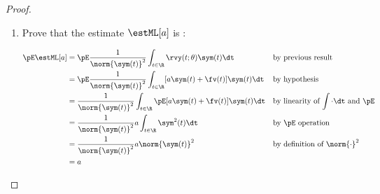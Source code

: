 \begin{proof}
\begin{enumerate}
\item Prove that the estimate $\estML[a]$ is :

\begin{align*}
   \pE\estML[a]
     &= \pE\frac{1}{\norm{\sym(t)}^2} \int_{t\in\R} \rvy(t;\theta)\sym(t) \dt
     && \text{by previous result}
   \\&= \pE\frac{1}{\norm{\sym(t)}^2} \int_{t\in\R} [ a \sym(t)+\fv(t)]\sym(t) \dt
     && \text{by hypothesis}
   \\&= \frac{1}{\norm{\sym(t)}^2} \int_{t\in\R} \pE[ a \sym(t)+\fv(t)]\sym(t) \dt
     && \text{by linearity of $\int\cdot\dt$ and $\pE$}
   \\&= \frac{1}{\norm{\sym(t)}^2}  a  \int_{t\in\R} \sym^2(t) \dt
     && \text{by $\pE$ operation}
   \\&= \frac{1}{\norm{\sym(t)}^2}  a  \norm{\sym(t)}^2
     && \text{by definition of $\norm{\cdot}^2$}
   \\&=   a
\end{align*}


\end{enumerate}
\end{proof}
